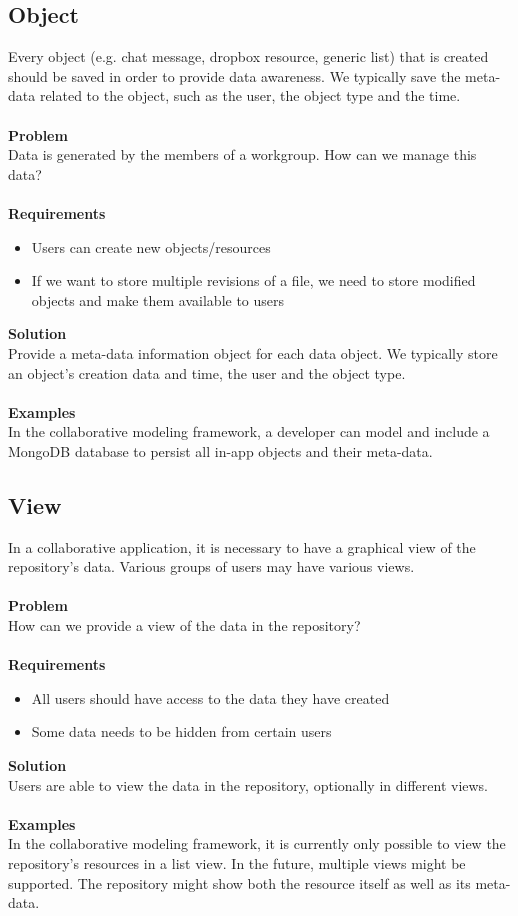 \subsection{Object}

Every object (e.g. chat message, dropbox resource, generic list) that is created should be saved in order to provide data awareness. We typically save the meta-data related to the object, such as the user, the object type and the time.
\\ \\
\textbf{Problem}
\\
Data is generated by the members of a workgroup. How can we manage this data?
\\ \\
\textbf{Requirements}
\begin{itemize}
\item{Users can create new objects/resources}
\item{If we want to store multiple revisions of a file, we need to store modified objects and make them available to users}
\end{itemize}
\textbf{Solution}
\\
Provide a meta-data information object for each data object. We typically store an object's creation data and time, the user and the object type.
\\ \\
\textbf{Examples}
\\
In the collaborative modeling framework, a developer can model and include a MongoDB \cite{MongoDB} database to persist all in-app objects and their meta-data. 

\subsection{View}

In a collaborative application, it is necessary to have a graphical view of the repository's data. Various groups of users may have various views.
\\ \\
\textbf{Problem}
\\
How can we provide a view of the data in the repository?
\\ \\
\textbf{Requirements}
\begin{itemize}
\item{All users should have access to the data they have created}
\item{Some data needs to be hidden from certain users}
\end{itemize}
\textbf{Solution}
\\
Users are able to view the data in the repository, optionally in different views.
\\ \\
\textbf{Examples}
\\
In the collaborative modeling framework, it is currently only possible to view the repository's resources in a list view. In the future, multiple views might be supported. The repository might show both the resource itself as well as its meta-data.

